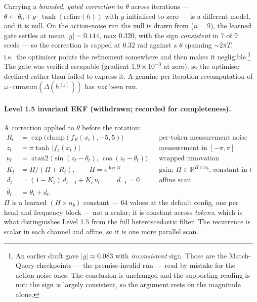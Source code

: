 \documentclass[11pt]{article}
\newcommand{\R}{\mathbb{R}}
\newcommand{\nb}{n_b}
\DeclareMathOperator{\atantwo}{atan2}
\begin{document}
Carrying a \emph{bounded, gated correction} to $\theta$ across iterations ---
$\theta \leftarrow \theta_0 + g\cdot\tanh(\text{refine}(h))$ with $g$ initialised
to zero --- is a different model, and it is null. On the action-noise run the null
is drawn from ($n=9$), the learned gate settles at mean $|g| = 0.144$, max $0.320$,
with the sign \emph{consistent} in $7$ of $9$ seeds --- so the correction is capped
at $0.32$ rad against a $\theta$ spanning $\sim 2\pi T$, i.e.\ the optimiser points
the refinement somewhere and then makes it negligible.\footnote{An earlier draft
gave $|g|\approx0.083$ with \emph{inconsistent} sign. Those are the Match-Query
checkpoints --- the premise-invalid run --- read by mistake for the action-noise
ones. The conclusion is unchanged and the supporting reading is not: the sign is
largely consistent, so the argument rests on the magnitude alone.} The gate was verified
escapable (gradient $1.9\times 10^{-3}$ at zero), so the optimiser declined rather
than failed to express it. A genuine per-iteration recomputation of
$\omega\cdot\mathrm{cumsum}(\Delta(h^{(j)}))$ has \emph{not} been run.

\paragraph{Level 1.5 invariant EKF (withdrawn; recorded for completeness).}
A correction applied to $\theta$ before the rotation:
\begin{align}
  R_t &= \exp\!\big(\mathrm{clamp}(f_R(x_t),-5,5)\big) & &\text{per-token measurement noise}\\
  z_t &= \pi\tanh\!\big(f_z(x_t)\big) & &\text{measurement in }[-\pi,\pi]\\
  \nu_t &= \atantwo\!\big(\sin(z_t-\theta_t),\,\cos(z_t-\theta_t)\big) & &\text{wrapped innovation}\\
  K_t &= \Pi/(\Pi + R_t),\qquad \Pi = e^{\log\Pi} & &\text{gain; }\Pi\in\R^{H\times \nb}\text{, constant in }t\\
  d_t &= (1-K_t)\,d_{t-1} + K_t\,\nu_t, \qquad d_{-1}=0 & &\text{affine scan}\\
  \hat\theta_t &= \theta_t + d_t . & &
\end{align}
$\Pi$ is a learned $(H\times\nb)$ constant --- 64 values at the default config, one
per head and frequency block --- not a scalar; it is constant across \emph{tokens},
which is what distinguishes Level 1.5 from the full heteroscedastic filter. The
recurrence is scalar in each channel and affine, so it is one more parallel scan.
\end{document}
